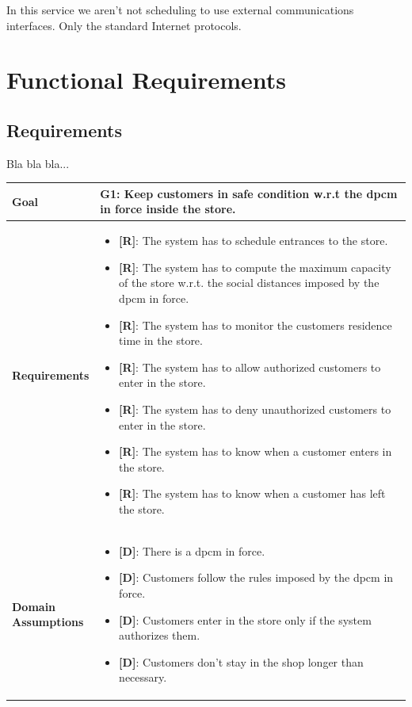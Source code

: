 In this service we aren't not scheduling to use external communications interfaces.
Only the standard Internet protocols.

\section{Functional Requirements}

\subsection{Requirements}

Bla bla bla...

\begin{table}[H]
\centering
\begin{tabular}{| m{} | m{} |} 
	\hline
	\textbf{Goal} &
		\textbf{G1: Keep customers in safe condition w.r.t the \gls{dpcm} in force inside the store.} \\
	\hline
	\textbf{Requirements} &
		\begin{itemize}
			\item {\textbf{[R]}}: The system has to schedule entrances to the store.
			\item {\textbf{[R]}}: The system has to compute the maximum capacity of the store w.r.t. the social distances imposed by the \gls{dpcm} in force.
			\item {\textbf{[R]}}: The system has to monitor the customers residence time in the store.
			\item {\textbf{[R]}}: The system has to allow authorized customers to enter in the store.
			\item {\textbf{[R]}}: The system has to deny unauthorized customers to enter in the store.
			\item {\textbf{[R]}}: The system has to know when a customer enters in the store.
			\item {\textbf{[R]}}: The system has to know when a customer has left the store.
		\end{itemize} \\
	\hline
	\shortstack[l]{\textbf{Domain} \\ \textbf{Assumptions}} & 
		\begin{itemize}
			\item {\textbf{[D]}}: There is a \gls{dpcm} in force.
			\item {\textbf{[D]}}: Customers follow the rules imposed by the \gls{dpcm} in force.
			\item {\textbf{[D]}}: Customers enter in the store only if the system authorizes them.
			\item {\textbf{[D]}}: Customers don't stay in the shop longer than necessary.
		\end{itemize} \\ 
	\hline
\end{tabular}
\end{table}

